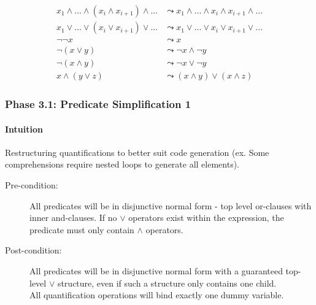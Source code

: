 \documentclass{article}
\begin{document}
\noindent\begin{minipage}{\linewidth} %
\begin{align}
  \tag{Flatten Nested $\land$}
  x_1 \land ... \land (x_i \land x_{i+1}) \land ...
  &\leadsto
  x_1 \land ... \land x_i \land x_{i+1} \land ...
  \\
  \tag{Flatten Nested $\lor$}
  x_1 \lor ... \lor (x_i \lor x_{i+1}) \lor ...
  &\leadsto
  x_1 \lor ... \lor x_i \lor x_{i+1} \lor ...
  \\
  \tag{Double Negation}
  \lnot \lnot x
  &\leadsto
  x
  \\
  \tag{Distribute De Morgan - Or}
  \lnot (x \lor y)
  &\leadsto
  \lnot x \land \lnot y
  \\
  \tag{Distribute De Morgan - And}
  \lnot (x \land y)
  &\leadsto
  \lnot x \lor \lnot y
  \\
  \tag{Distribute $\land$ over $\lor$}
  x \land (y \lor z)
  &\leadsto
  (x \land y) \lor (x \land z)
\end{align}
\end{minipage}

\subsubsection{Phase 3.1: Predicate Simplification 1}

\paragraph{Intuition} Restructuring quantifications to better suit code generation (ex. Some comprehensions require nested loops to generate all elements).


\begin{description}
  \item[Pre-condition:] All predicates will be in disjunctive normal form - top level or-clauses with inner and-clauses. If no $\lor$ operators exist within the expression, the predicate must only contain $\land$ operators.
  \item[Post-condition:] All predicates will be in disjunctive normal form with a guaranteed top-level $\lor$ structure, even if such a structure only contains one child.
  \\
  All quantification operations will bind exactly one dummy variable.
\end{description}
\end{document}
